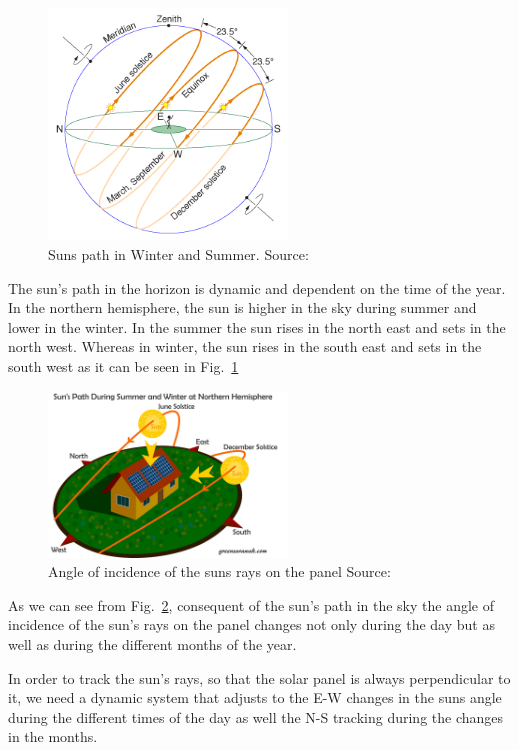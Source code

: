 \documentclass[conference]{IEEEtran}
\begin{document}
\begin{figure}[htbp]
	\includegraphics[width=2.5in]{img/SunsPath1.png}
	\centering
    \captionsetup{justification=centering}
	\caption{Suns path in Winter and Summer. Source: \cite{b1}}
	\label{fig:SunsPath1}
\end{figure}

The sun's path in the horizon is dynamic and dependent on the time of the year. In the northern hemisphere, the sun is higher in the sky during summer and lower in the winter. In the summer the sun rises in the north east and sets in the north west. Whereas in winter, the sun rises in the south east and sets in the south west as it can be seen in Fig.~\ref{fig:SunsPath1}

\begin{figure}[htbp]
    \includegraphics[width=2.5in]{img/SunsPath2.png}
    \centering
    \captionsetup{justification=centering}
    \caption{Angle of incidence of the suns rays on the panel Source: \cite{b2}}
    \label{fig:SunsPath2}
\end{figure}

\par\smallskip
As we can see from Fig.~\ref{fig:SunsPath2}, consequent of the sun's path in the sky the angle of incidence of the sun's rays on the panel changes not only during the day but as well as during the different months of the year.

\par\smallskip
In order to track the sun's rays, so that the solar panel is always perpendicular to it, we need a dynamic system that adjusts to the E-W changes in the suns angle during the different times of the day as well the N-S tracking during the changes in the months.
\end{document}
